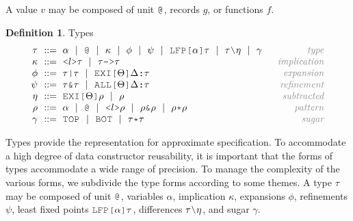 \documentclass[acmsmall]{acmart}
\theoremstyle{definition}
\newtheorem{definition}{Definition}[section]
\begin{document}
\noindent
A value $v$ may be composed of unit $\J{@}$, records $g$, or functions $f$. 

\begin{definition} Types 
  \label{def:types}
  \[\begin{array}[t]{r@{}l@{}r}
    \nonterm{\tau} & \is 
    \begin{array}[t]{@{}l}
      \alpha \sep
      \J{@} \sep
      \kappa \sep 
      \phi \sep 
      \psi \sep 
      \J{LFP[}\alpha\J{]}\tau \sep
      \tau \typdiff \eta \sep
      \gamma
    \end{array}
    & \com{type}
    \\
    \nonterm{\kappa} & \is 
    \begin{array}[t]{@{}l}
      \J{<} l \J{>} \tau \sep 
      \tau\J{->}\tau
    \end{array}
    & \com{implication}
    \\
    \nonterm{\phi} & \is 
    \begin{array}[t]{@{}l}
      \tau\J{|}\tau \sep 
      \J{EXI[}\Theta\J{]} \Delta \J{:} \tau
    \end{array}
    & \com{expansion}
    \\
    \nonterm{\psi} & \is 
    \begin{array}[t]{@{}l}
      \tau\J{\&}\tau \sep 
      \J{ALL[}\Theta\J{]} \Delta \J{:} \tau
    \end{array}
    & \com{refinement}
    \\
    \nonterm{\eta} & \is 
    \begin{array}[t]{@{}l}
      \J{EXI[}\Theta \J{]} \rho \sep 
      \rho
    \end{array}
    & \com{subtracted}
    \\
    \nonterm{\rho} & \is 
    \begin{array}[t]{@{}l}
      \alpha \sep
      \J{@} \sep
      \J{<}l\J{>}\rho \sep 
      \rho\J{\&}\rho \sep
      \rho\J{*}\rho
    \end{array}
    & \com{pattern}
    \\
    \nonterm{\gamma} & \is 
    \begin{array}[t]{@{}l}
      \J{TOP} \sep \J{BOT} \sep 
      \tau \J{*} \tau 
    \end{array}
    & \com{sugar}
  \end{array}\]
\end{definition}

\noindent
Types provide the representation for approximate specification.
To accommodate a high degree of data constructor reusability,
it is important that the forms of types accommodate a wide range of precision.
To manage the complexity of the various forms, we subdivide the type forms
according to some themes.
A type $\tau$ may be composed of unit $\J{@}$, variables $\alpha$, 
implication $\kappa$, expansions $\phi$, refinements $\psi$,
least fixed points $\J{LFP[}\alpha \J{]} \tau$,
differences $\tau \typdiff \eta$, and sugar $\gamma$.
\end{document}
